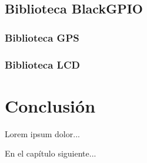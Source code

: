 \subsection{Biblioteca BlackGPIO}

\subsubsection{Biblioteca GPS}

\subsubsection{Biblioteca LCD}

\section{Conclusión}

Lorem ipsum dolor...

En el capítulo siguiente...